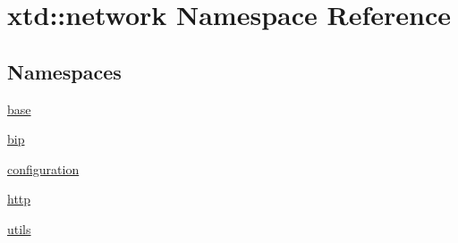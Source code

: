 \hypertarget{namespacextd_1_1network}{}\section{xtd\+:\+:network Namespace Reference}
\label{namespacextd_1_1network}
\subsection*{Namespaces}
\begin{DoxyCompactItemize}
\item 
 \hyperlink{namespacextd_1_1network_1_1base}{base}
\item 
 \hyperlink{namespacextd_1_1network_1_1bip}{bip}
\item 
 \hyperlink{namespacextd_1_1network_1_1configuration}{configuration}
\item 
 \hyperlink{namespacextd_1_1network_1_1http}{http}
\item 
 \hyperlink{namespacextd_1_1network_1_1utils}{utils}
\end{DoxyCompactItemize}
